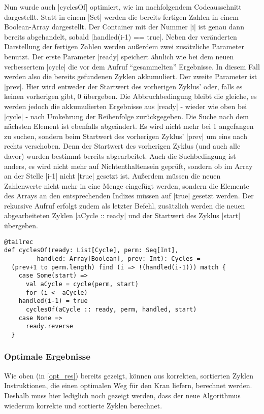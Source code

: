 Nun wurde auch |cyclesOf| optimiert, wie im nachfolgendem Codeausschnitt dargestellt. Statt in einem |Set| werden die bereits fertigen Zahlen in einem Boolean-Array dargestellt.
Der Container mit der Nummer |i| ist genau dann bereits abgehandelt, sobald |handled(i-1) == true|.
Neben der veränderten Darstellung der fertigen Zahlen werden außerdem zwei zusätzliche Parameter benutzt.
Der erste Parameter |ready| speichert ähnlich wie bei dem neuen verbessertem |cycle| die vor dem Aufruf ``gesammelten'' Ergebnisse.
In diesem Fall werden also die bereits gefundenen Zyklen akkumuliert.
Der zweite Parameter ist |prev|. Hier wird entweder der Startwert des vorherigen Zyklus' oder, falls es keinen vorherigen gibt, 0 übergeben.
Die Abbruchbedingung bleibt die gleiche, es werden jedoch die akkumulierten Ergebnisse aus |ready| - wieder wie oben bei |cycle| - nach Umkehrung der Reihenfolge zurückgegeben.
Die Suche nach dem nächsten Element ist ebenfalls abgeändert.
Es wird nicht mehr bei 1 angefangen zu suchen, sondern beim Startwert des vorherigen Zyklus' |prev| um eins nach rechts verschoben.
Denn der Startwert des vorherigen Zyklus (und auch alle davor) wurden bestimmt bereits abgearbeitet.
Auch die Suchbedingung ist anders, es wird nicht mehr auf Nichtenthaltensein geprüft, sondern ob im Array an der Stelle |i-1| nicht |true| gesetzt ist.
Außerdem müssen die neuen Zahlenwerte nicht mehr in eine Menge eingefügt werden, sondern die Elemente des Arrays an den entsprechenden Indizes müssen auf |true| gesetzt werden.
Der rekursive Aufruf erfolgt zudem als letzter Befehl,
zusätzlich werden die neuen abgearbeiteten Zyklen |aCycle :: ready| und der Startwert des Zyklus |start| übergeben.
\begin{lstlisting}
@tailrec
def cyclesOf(ready: List[Cycle], perm: Seq[Int],
	     handled: Array[Boolean], prev: Int): Cycles =
  (prev+1 to perm.length) find (i => !(handled(i-1))) match {
    case Some(start) =>
      val aCycle = cycle(perm, start)
      for (i <- aCycle)
	handled(i-1) = true
      cyclesOf(aCycle :: ready, perm, handled, start)
    case None =>
      ready.reverse
  }
\end{lstlisting}

\subsubsection{Optimale Ergebnisse}
Wie oben (in \ref{opt_res}) bereits gezeigt, können aus korrekten, sortierten Zyklen Instruktionen, die einen optimalen Weg für den Kran liefern, berechnet werden.
Deshalb muss hier lediglich noch gezeigt werden, dass der neue Algorithmus wiederum korrekte und sortierte Zyklen berechnet. 

